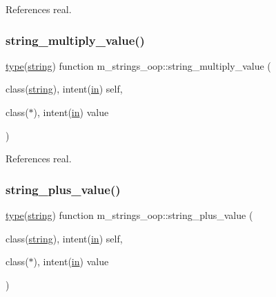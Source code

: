 References real.

\mbox{\label{namespacem__strings__oop_a9624f1e09be383f993e7c0e94b230deb}} 
\subsubsection{\texorpdfstring{string\+\_\+multiply\+\_\+value()}{string\_multiply\_value()}}
{\footnotesize\ttfamily \hyperlink{stop__watch_83_8txt_a70f0ead91c32e25323c03265aa302c1c}{type}(\hyperlink{structm__strings__oop_1_1string}{string}) function m\+\_\+strings\+\_\+oop\+::string\+\_\+multiply\+\_\+value (\begin{DoxyParamCaption}\item[{class(\hyperlink{structm__strings__oop_1_1string}{string}), intent(\hyperlink{M__journal_83_8txt_afce72651d1eed785a2132bee863b2f38}{in})}]{self,  }\item[{class($\ast$), intent(\hyperlink{M__journal_83_8txt_afce72651d1eed785a2132bee863b2f38}{in})}]{value }\end{DoxyParamCaption})\hspace{0.3cm}{\ttfamily [private]}}



References real.

\mbox{\label{namespacem__strings__oop_abf27744e539317dac81d6ed1fb736059}} 
\subsubsection{\texorpdfstring{string\+\_\+plus\+\_\+value()}{string\_plus\_value()}}
{\footnotesize\ttfamily \hyperlink{stop__watch_83_8txt_a70f0ead91c32e25323c03265aa302c1c}{type}(\hyperlink{structm__strings__oop_1_1string}{string}) function m\+\_\+strings\+\_\+oop\+::string\+\_\+plus\+\_\+value (\begin{DoxyParamCaption}\item[{class(\hyperlink{structm__strings__oop_1_1string}{string}), intent(\hyperlink{M__journal_83_8txt_afce72651d1eed785a2132bee863b2f38}{in})}]{self,  }\item[{class($\ast$), intent(\hyperlink{M__journal_83_8txt_afce72651d1eed785a2132bee863b2f38}{in})}]{value }\end{DoxyParamCaption})\hspace{0.3cm}{\ttfamily [private]}}



